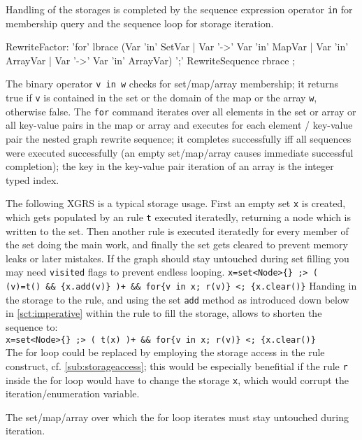 \noindent Handling of the storages is completed by the sequence expression operator \texttt{in} for membership query and the sequence loop for storage iteration.

\begin{rail}
  RewriteFactor:
    'for' lbrace (Var 'in' SetVar | Var '->' Var 'in' MapVar | Var 'in' ArrayVar | Var '->' Var 'in' ArrayVar) ';' RewriteSequence rbrace
    ;
\end{rail}

The binary operator \texttt{v in w} checks for set/map/array membership; it returns true if \texttt{v} is contained in the set or the domain of the map or the array \texttt{w}, otherwise false.
The \texttt{for} command iterates over all elements in the set or array or all key-value pairs in the map or array and executes for each element / key-value pair the nested graph rewrite sequence; it completes successfully iff all sequences were executed successfully (an empty set/map/array causes immediate successful completion); the key in the key-value pair iteration of an array is the integer typed index.

\begin{example}
The following XGRS is a typical storage usage.
First an empty set \texttt{x} is created, which gets populated by an rule \texttt{t} executed iteratedly, returning a node which is written to the set.
Then another rule is executed iteratedly for every member of the set doing the main work, and finally the set gets cleared to prevent memory leaks or later mistakes.
If the graph should stay untouched during set filling you may need \texttt{visited} flags to prevent endless looping.
\verb#x=set<Node>{} ;> ( (v)=t() && {x.add(v)} )+ && for{v in x; r(v)} <; {x.clear()}#
Handing in the storage to the rule, and using the set \texttt{add} method as introduced down below in \ref{sct:imperative} within the rule to fill the storage, allows to shorten the sequence to:\\
\verb#x=set<Node>{} ;> ( t(x) )+ && for{v in x; r(v)} <; {x.clear()}#\\
The for loop could be replaced by employing the storage access in the rule construct, cf. \ref{sub:storageaccess}; this would be especially benefitial if the rule \texttt{r} inside the for loop would have to change the storage \texttt{x}, which would corrupt the iteration/enumeration variable.
\end{example}

\begin{warning}
The set/map/array over which the for loop iterates must stay untouched during iteration.
\end{warning}


